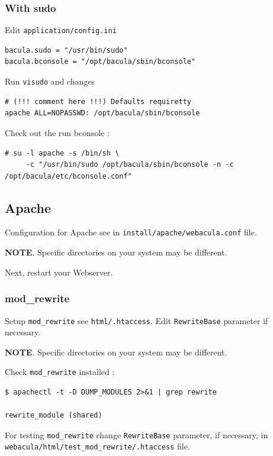 \documentclass[10pt]{article}
\begin{document}
\subsubsection{With sudo}
\label{Install:Setting up to run bconsole from under Webacula:with sudo}

Edit \texttt{application/config.ini}
\begin{verbatim}
bacula.sudo = "/usr/bin/sudo"
bacula.bconsole = "/opt/bacula/sbin/bconsole"
\end{verbatim}

Run \texttt{visudo} and changes
\begin{verbatim}
# (!!! comment here !!!) Defaults requiretty
apache ALL=NOPASSWD: /opt/bacula/sbin/bconsole
\end{verbatim}

Check out the run bconsole :
\begin{verbatim}
# su -l apache -s /bin/sh \
     -c "/usr/bin/sudo /opt/bacula/sbin/bconsole -n -c /opt/bacula/etc/bconsole.conf"
\end{verbatim}



\subsection{Apache}
\label{Install:Apache}

Configuration for Apache see in \texttt{install/apache/webacula.conf} file.

\textbf{NOTE}. Specific directories on your system may be different.

Next, restart your Webserver.



\subsubsection{mod\_rewrite}
\label{Install:Apache:mod rewrite}

Setup \texttt{mod\_rewrite} see \texttt{html/.htaccess}. Edit \texttt{RewriteBase} parameter if necessary.

\textbf{NOTE}. Specific directories on your system may be different.

Check \texttt{mod\_rewrite} installed :
\begin{verbatim}
$ apachectl -t -D DUMP_MODULES 2>&1 | grep rewrite

rewrite_module (shared)
\end{verbatim}

For testing \texttt{mod\_rewrite} change \texttt{RewriteBase} parameter, if necessary, in \texttt{webacula/html/test\_mod\_rewrite/.htaccess} file.
\end{document}
